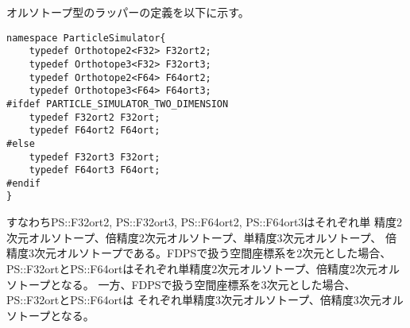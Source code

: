 オルソトープ型のラッパーの定義を以下に示す。
\begin{lstlisting}[caption=Orthotope Wrapper]
namespace ParticleSimulator{
    typedef Orthotope2<F32> F32ort2;
    typedef Orthotope3<F32> F32ort3;
    typedef Orthotope2<F64> F64ort2;
    typedef Orthotope3<F64> F64ort3;
#ifdef PARTICLE_SIMULATOR_TWO_DIMENSION
    typedef F32ort2 F32ort;
    typedef F64ort2 F64ort;
#else
    typedef F32ort3 F32ort;
    typedef F64ort3 F64ort;
#endif
}
\end{lstlisting}

すなわちPS::F32ort2, PS::F32ort3, PS::F64ort2, PS::F64ort3はそれぞれ単
精度2次元オルソトープ、倍精度2次元オルソトープ、単精度3次元オルソトープ、
倍精度3次元オルソトープである。FDPSで扱う空間座標系を2次元とした場合、
PS::F32ortとPS::F64ortはそれぞれ単精度2次元オルソトープ、倍精度2次元オルソトープとなる。
一方、FDPSで扱う空間座標系を3次元とした場合、PS::F32ortとPS::F64ortは
それぞれ単精度3次元オルソトープ、倍精度3次元オルソトープとなる。

